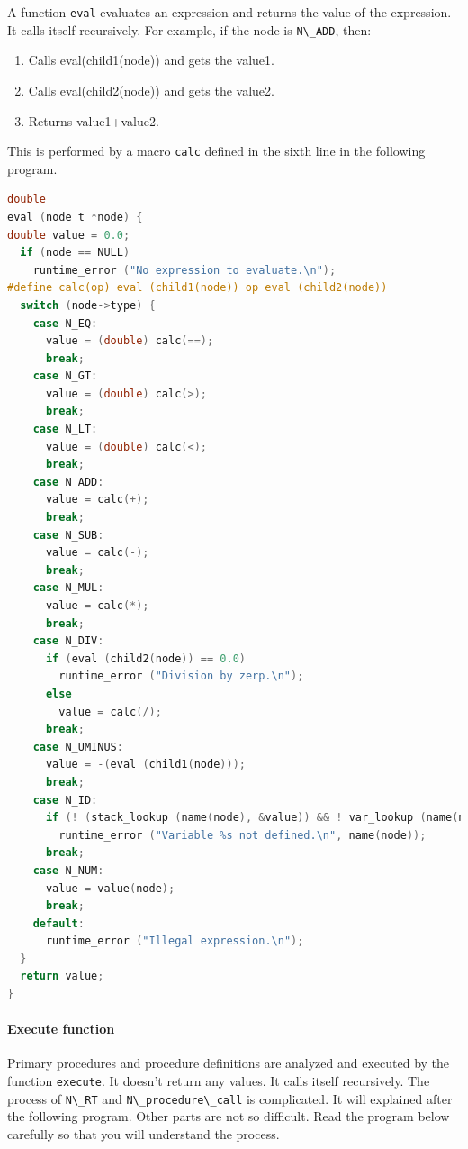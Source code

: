 A function \passthrough{\lstinline!eval!} evaluates an expression and
returns the value of the expression. It calls itself recursively. For
example, if the node is \passthrough{\lstinline!N\_ADD!}, then:

\begin{enumerate}
\def\labelenumi{\arabic{enumi}.}
\tightlist
\item
  Calls eval(child1(node)) and gets the value1.
\item
  Calls eval(child2(node)) and gets the value2.
\item
  Returns value1+value2.
\end{enumerate}

This is performed by a macro \passthrough{\lstinline!calc!} defined in
the sixth line in the following program.

\begin{lstlisting}[language=C]
double
eval (node_t *node) {
double value = 0.0;
  if (node == NULL)
    runtime_error ("No expression to evaluate.\n");
#define calc(op) eval (child1(node)) op eval (child2(node))
  switch (node->type) {
    case N_EQ:
      value = (double) calc(==);
      break;
    case N_GT:
      value = (double) calc(>);
      break;
    case N_LT:
      value = (double) calc(<);
      break;
    case N_ADD:
      value = calc(+);
      break;
    case N_SUB:
      value = calc(-);
      break;
    case N_MUL:
      value = calc(*);
      break;
    case N_DIV:
      if (eval (child2(node)) == 0.0)
        runtime_error ("Division by zerp.\n");
      else
        value = calc(/);
      break;
    case N_UMINUS:
      value = -(eval (child1(node)));
      break;
    case N_ID:
      if (! (stack_lookup (name(node), &value)) && ! var_lookup (name(node), &value) )
        runtime_error ("Variable %s not defined.\n", name(node));
      break;
    case N_NUM:
      value = value(node);
      break;
    default:
      runtime_error ("Illegal expression.\n");
  }
  return value;
}
\end{lstlisting}

\paragraph{Execute function}\label{execute-function}

Primary procedures and procedure definitions are analyzed and executed
by the function \passthrough{\lstinline!execute!}. It doesn't return any
values. It calls itself recursively. The process of
\passthrough{\lstinline!N\_RT!} and
\passthrough{\lstinline!N\_procedure\_call!} is complicated. It will
explained after the following program. Other parts are not so difficult.
Read the program below carefully so that you will understand the
process.

